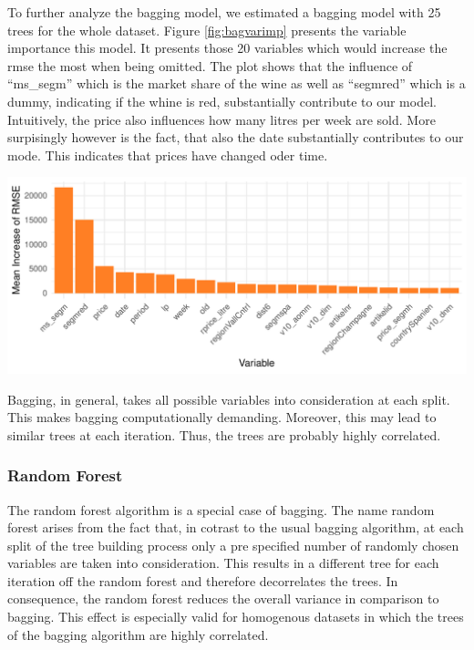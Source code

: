 \documentclass[11pt,]{article}
\let\origfigure\figure
\let\endorigfigure\endfigure
\renewenvironment{figure}[1][2] {
    \expandafter\origfigure\expandafter[H]
} {
    \endorigfigure
}
\begin{document}
To further analyze the \ac{bagging} model, we estimated a \ac{bagging}
model with 25 trees for the whole dataset. Figure \ref{fig:bagvarimp}
presents the variable importance this model. It presents those 20
variables which would increase the \ac{rmse} the most when being
omitted. The plot shows that the influence of \enquote{ms\_segm} which
is the market share of the wine as well as \enquote{segmred} which is a
dummy, indicating if the whine is red, substantially contribute to our
model. Intuitively, the price also influences how many litres per week
are sold. More surpisingly however is the fact, that also the date
substantially contributes to our mode. This indicates that prices have
changed oder time.

\begin{figure}

\includegraphics{../00_data/output_paper/15_var_imp_bagging} \hfill{}

\caption{\label{fig:bagvarimp}Bagging: Variable Importance.}\label{fig:bag_varimp}
\end{figure}

Bagging, in general, takes all possible variables into consideration at
each split. This makes \ac{bagging} computationally demanding. Moreover,
this may lead to similar trees at each iteration. Thus, the trees are
probably highly correlated.

\hypertarget{random-forest}{%
\subsubsection{\texorpdfstring{Random Forest
\label{chap:rand_for}}{Random Forest }}\label{random-forest}}

The random forest algorithm is a special case of \ac{bagging}. The name
random forest arises from the fact that, in cotrast to the usual
\ac{bagging} algorithm, at each split of the tree building process only
a pre specified number of randomly chosen variables are taken into
consideration. This results in a different tree for each iteration off
the random forest and therefore decorrelates the trees. In consequence,
the random forest reduces the overall variance in comparison to
\ac{bagging}. This effect is especially valid for homogenous datasets in
which the trees of the \ac{bagging} algorithm are highly correlated.
\end{document}
